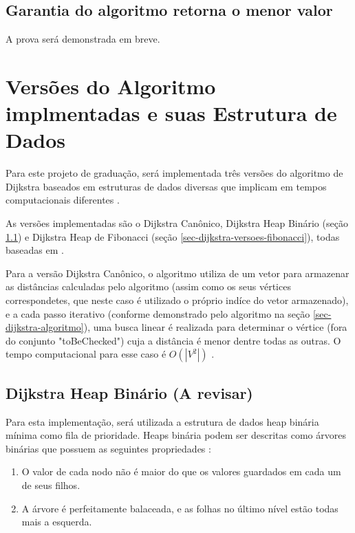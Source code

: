\subsection{Garantia do algoritmo retorna o menor valor}
\label{sec-dijkstra-algoritmo-prova}
A prova será demonstrada em breve.

\section{Versões do Algoritmo implmentadas e suas Estrutura de Dados}
\label{sec-dijkstra-versoes}
Para este projeto de graduação, será implementada três versões do algoritmo de Dijkstra baseados em estruturas de dados diversas que implicam em tempos computacionais diferentes \cite{cormen2009introduction}.

As versões implementadas são o Dijkstra Canônico, Dijkstra Heap Binário (seção \ref{sec-dijkstra-versoes-heap}) e Dijkstra Heap de Fibonacci (seção \ref{sec-dijkstra-versoes-fibonacci}), todas baseadas em .

Para a versão Dijkstra Canônico, o algoritmo utiliza de um vetor para armazenar as distâncias calculadas pelo algoritmo (assim como os seus vértices correspondetes, que neste caso é utilizado o próprio indíce do vetor armazenado), e a cada passo iterativo (conforme demonstrado pelo algoritmo na seção \ref{sec-dijkstra-algoritmo}), uma busca linear é realizada para determinar o vértice (fora do conjunto "toBeChecked") cuja a distância é menor dentre todas as outras. O tempo computacional para esse caso é $O(|V^{2}|)$ \cite{drozdek2012data}.

\subsection{Dijkstra Heap Binário (A revisar)}
\label{sec-dijkstra-versoes-heap}
Para esta implementação, será utilizada a estrutura de dados heap binária mínima como fila de prioridade. Heaps binária podem ser descritas como árvores binárias que possuem as seguintes propriedades \cite{drozdek2012data}:
\begin{enumerate}
 \item O valor de cada nodo não é maior do que os valores guardados em cada um de seus filhos.
 \item A árvore é perfeitamente balaceada, e as folhas no último nível estão todas mais a esquerda.
\end{enumerate}

